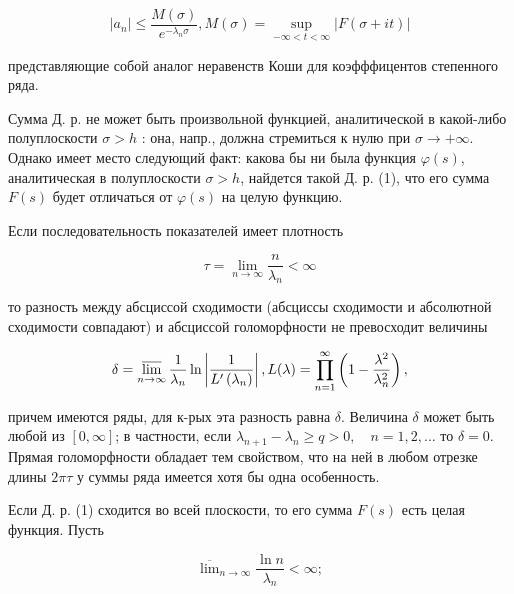 \documentclass[10pt]{article}
\begin{document}
\[

\left|a_{n}\right| \leqslant \frac{M(\sigma)}{e^{-\lambda_{n} \sigma}}, M(\sigma)=\sup _{-\infty<t<\infty}|F(\sigma+i t)|

\]



представляющие собой аналог неравенств Коши для коэфффицентов степенного ряда.



Сумма Д. р. не может быть произвольной функцией, аналитической в какой-либо полуплоскости $\sigma>h$ : она, напр., должна стремиться к нулю при $\sigma \rightarrow+\infty$. Однако имеет место следующий факт: какова бы ни была функция $\varphi(s)$, аналитическая в полуплоскости $\sigma>h$, найдется такой Д. р. (1), что его сумма $F(s)$ будет отличаться от $\varphi(s)$ на целую функцию.



Если последовательность показателей имеет плотность



\[

\tau=\lim _{n \rightarrow \infty} \frac{n}{\lambda_{n}}<\infty

\]



то разность между абсциссой сходимости (абсциссы сходимости и абсолютной сходимости совпадают) и абсциссой голоморфности не превосходит величины



\[

\delta=\varlimsup_{n \rightarrow \infty} \frac{1}{\lambda_{n}} \ln \left|\frac{1}{L^{\prime}\left(\lambda_{n}\right)}\right|, L(\lambda)=\prod_{n=1}^{\infty}\left(1-\frac{\lambda^{2}}{\lambda_{n}^{2}}\right),

\]



причем имеются ряды, для к-рых эта разность равна $\delta$. Величина $\delta$ может быть любой из $[0, \infty]$; в частности, если $\lambda_{n+1}-\lambda_{n} \geqslant q>0, \quad n=1,2, \ldots$ то $\delta=0$. Прямая голоморфности обладает тем свойством, что на ней в любом отрезке длины $2 \pi \tau$ у суммы ряда имеется хотя бы одна особенность.



Если Д. р. (1) сходится во всей плоскости, то его сумма $F(s)$ есть целая функция. Пусть



\[

\overline{\lim }_{n \rightarrow \infty} \frac{\ln n}{\lambda_{n}}<\infty ;

\]
\end{document}
